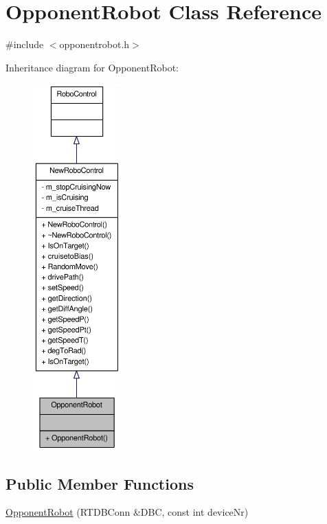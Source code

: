 \hypertarget{classOpponentRobot}{
\section{OpponentRobot Class Reference}
\label{classOpponentRobot}
}


{\ttfamily \#include $<$opponentrobot.h$>$}



Inheritance diagram for OpponentRobot:\nopagebreak
\begin{figure}[H]
\begin{center}
\leavevmode
\includegraphics[height=400pt]{classOpponentRobot__inherit__graph}
\end{center}
\end{figure}
\subsection*{Public Member Functions}
\begin{DoxyCompactItemize}
\item 
\hyperlink{classOpponentRobot_a315c08a9f17d278b1bb8067929b38f83}{OpponentRobot} (RTDBConn \&DBC, const int deviceNr)
\end{DoxyCompactItemize}


